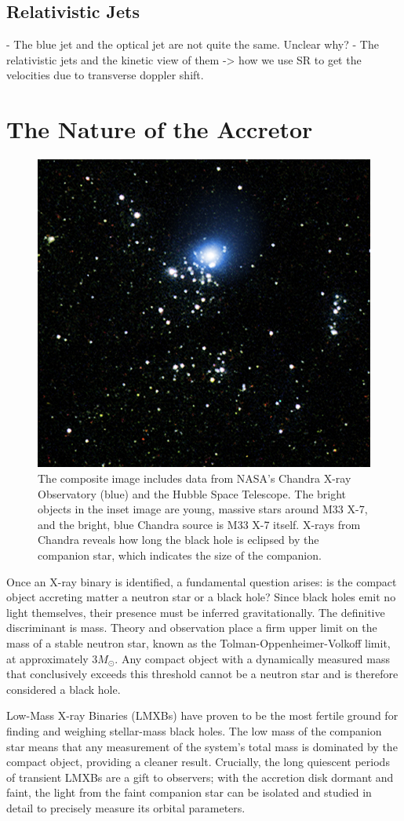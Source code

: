 \subsection{Relativistic Jets}
- The blue jet and the optical jet are not quite the same. Unclear why? 
- The relativistic jets and the kinetic view of them -> how we use SR to get the velocities due to transverse doppler shift.

\section{The Nature of the Accretor}

\begin{figure}[ht!]
    \centering
    \includegraphics[width=0.5\linewidth]{Pictures/figures/x-7.png}
    \caption{The composite image includes data from NASA's Chandra X-ray Observatory (blue) and the Hubble Space Telescope. The bright objects in the inset image are young, massive stars around M33 X-7, and the bright, blue Chandra source is M33 X-7 itself. X-rays from Chandra reveals how long the black hole is eclipsed by the companion star, which indicates the size of the companion. }
\end{figure}

Once an X-ray binary is identified, a fundamental question arises: is the compact object accreting matter a neutron star or a black hole? Since black holes emit no light themselves, their presence must be inferred gravitationally. The definitive discriminant is mass. Theory and observation place a firm upper limit on the mass of a stable neutron star, known as the Tolman-Oppenheimer-Volkoff limit, at approximately $3 M_{\odot}$. Any compact object with a dynamically measured mass that conclusively exceeds this threshold cannot be a neutron star and is therefore considered a black hole.

Low-Mass X-ray Binaries (LMXBs) have proven to be the most fertile ground for finding and weighing stellar-mass black holes. The low mass of the companion star means that any measurement of the system's total mass is dominated by the compact object, providing a cleaner result. Crucially, the long quiescent periods of transient LMXBs are a gift to observers; with the accretion disk dormant and faint, the light from the faint companion star can be isolated and studied in detail to precisely measure its orbital parameters.

